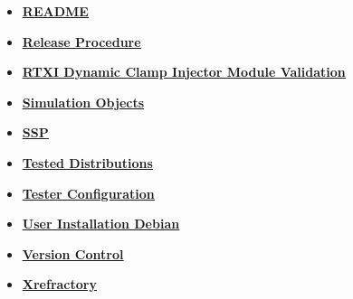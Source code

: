 \documentclass[12pt]{article}
\begin{document}
\begin{itemize}
\item \href{../README/README.pdf}{\bf \underline{README}}

\item \href{../release-procedure/release-procedure.pdf}{\bf \underline{Release Procedure}}

\item \href{../rtxi-injector-validation/rtxi-injector-validation.pdf}{\bf \underline{RTXI Dynamic Clamp Injector Module Validation}}

\item \href{../simulation-objects/simulation-objects.pdf}{\bf \underline{Simulation Objects}}

\item \href{../ssp/ssp.pdf}{\bf \underline{SSP}}

\item \href{../tested-distributions/tested-distributions.pdf}{\bf \underline{Tested Distributions}}

\item \href{../tester-configuration/tester-configuration.pdf}{\bf \underline{Tester Configuration}}

\item \href{../installation-debian/installation-debian.pdf}{\bf \underline{User Installation Debian}}

\item \href{../version-control/version-control.pdf}{\bf \underline{Version Control}}

\item \href{../cxref/cxref.pdf}{\bf \underline{Xrefractory}}


\end{itemize}

\end{document}
